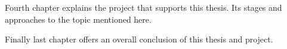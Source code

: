 Fourth chapter explains the project that supports this thesis. Its stages and approaches to the topic mentioned here.

Finally last chapter offers an overall conclusion of this thesis and project.









